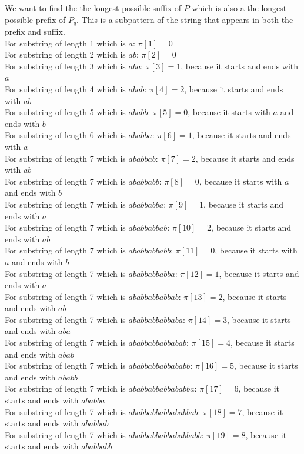 \documentclass{article}
\begin{document}
We want to find the the longest possible suffix of $P$ which is also a the longest possible prefix of $P_q$. This is a subpattern of the string that appears in both the prefix and suffix.\\


For substring of length 1 which is $a$: $\pi[1] = 0$\\
For substring of length 2 which is $ab$: $\pi[2] = 0$\\
For substring of length 3 which is $aba$: $\pi[3] = 1$, because it starts and ends with $a$\\
For substring of length 4 which is $abab$: $\pi[4] = 2$, because it starts and ends with $ab$\\
For substring of length 5 which is $ababb$: $\pi[5] = 0$, because it starts with $a$ and ends with $b$\\
For substring of length 6 which is $ababba$: $\pi[6] = 1$, because it starts and ends with $a$\\
For substring of length 7 which is $ababbab$: $\pi[7] = 2$, because it starts and ends with $ab$\\
For substring of length 7 which is $ababbabb$: $\pi[8] = 0$, because it starts with $a$ and ends with $b$\\
For substring of length 7 which is $ababbabba$: $\pi[9] = 1$, because it starts and ends with $a$\\
For substring of length 7 which is $ababbabbab$: $\pi[10] = 2$, because it starts and ends with $ab$\\
For substring of length 7 which is $ababbabbabb$: $\pi[11] = 0$, because it starts with $a$ and ends with $b$\\
For substring of length 7 which is $ababbabbabba$: $\pi[12] = 1$, because it starts and ends with $a$\\
For substring of length 7 which is $ababbabbabbab$: $\pi[13] = 2$, because it starts and ends with $ab$\\
For substring of length 7 which is $ababbabbabbaba$: $\pi[14] = 3$, because it starts and ends with $aba$\\
For substring of length 7 which is $ababbabbabbabab$: $\pi[15] = 4$, because it starts and ends with $abab$\\
For substring of length 7 which is $ababbabbabbababb$: $\pi[16] = 5$, because it starts and ends with $ababb$\\
For substring of length 7 which is $ababbabbabbababba$: $\pi[17] = 6$, because it starts and ends with $ababba$\\
For substring of length 7 which is $ababbabbabbababbab$: $\pi[18] = 7$, because it starts and ends with $ababbab$\\
For substring of length 7 which is $ababbabbabbababbabb$: $\pi[19] = 8$, because it starts and ends with $ababbabb$\\
\end{document}
